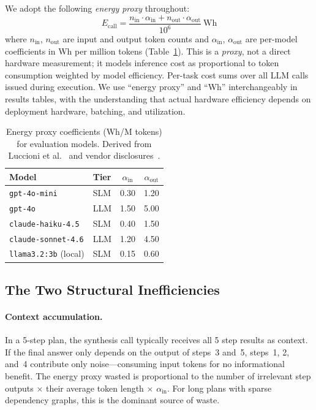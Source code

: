 \documentclass[sigconf,authordraft]{acmart}
\begin{document}
We adopt the following \emph{energy proxy} throughout:
\[
  E_{\text{call}} = \frac{n_{\text{in}} \cdot \alpha_{\text{in}} + n_{\text{out}} \cdot \alpha_{\text{out}}}{10^6}\ \text{Wh}
\]
where $n_{\text{in}}$, $n_{\text{out}}$ are input and output token counts and $\alpha_{\text{in}}$, $\alpha_{\text{out}}$ are per-model coefficients in Wh per million tokens (Table~\ref{tab:energy-tiers}).
This is a \emph{proxy}, not a direct hardware measurement; it models inference cost as proportional to token consumption weighted by model efficiency.
Per-task cost sums over all LLM calls issued during execution.
We use ``energy proxy'' and ``Wh'' interchangeably in results tables, with the understanding that actual hardware efficiency depends on deployment hardware, batching, and utilization.

\begin{table}[h]
\centering
\caption{Energy proxy coefficients (Wh/M tokens) for evaluation models.
Derived from Luccioni et al.~\cite{luccioni2023power} and vendor disclosures~\cite{openai2024efficiency,anthropic2024efficiency}.}
\label{tab:energy-tiers}
\begin{tabular}{llcc}
\toprule
Model & Tier & $\alpha_{\text{in}}$ & $\alpha_{\text{out}}$ \\
\midrule
\texttt{gpt-4o-mini}         & SLM & 0.30 & 1.20 \\
\texttt{gpt-4o}              & LLM & 1.50 & 5.00 \\
\texttt{claude-haiku-4.5}    & SLM & 0.40 & 1.50 \\
\texttt{claude-sonnet-4.6}   & LLM & 1.20 & 4.50 \\
\texttt{llama3.2:3b} (local) & SLM & 0.15 & 0.60 \\
\bottomrule
\end{tabular}
\end{table}

\subsection{The Two Structural Inefficiencies}

\paragraph{Context accumulation.}
In a 5-step plan, the synthesis call typically receives all 5 step results as context.
If the final answer only depends on the output of steps~3 and~5, steps~1, 2, and~4 contribute only noise---consuming input tokens for no informational benefit.
The energy proxy wasted is proportional to the number of irrelevant step outputs $\times$ their average token length $\times$ $\alpha_{\text{in}}$.
For long plans with sparse dependency graphs, this is the dominant source of waste.
\end{document}
